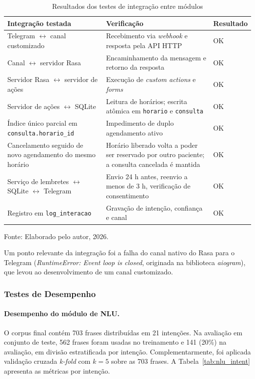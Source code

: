 \documentclass[12pt,a4paper]{extarticle}
\begin{document}
\begin{table}[H]
\centering
\caption{Resultados dos testes de integração entre módulos}
\label{tab:integracao}
\begin{tabular}{p{5.2cm}p{5.4cm}p{2cm}}
\hline
\textbf{Integração testada} & \textbf{Verificação} & \textbf{Resultado} \\
\hline
Telegram $\leftrightarrow$ canal customizado & Recebimento via \textit{webhook} e resposta pela API HTTP & OK \\
Canal $\leftrightarrow$ servidor Rasa & Encaminhamento da mensagem e retorno da resposta & OK \\
Servidor Rasa $\leftrightarrow$ servidor de ações & Execução de \textit{custom actions} e \textit{forms} & OK \\
Servidor de ações $\leftrightarrow$ SQLite & Leitura de horários; escrita atômica em \texttt{horario} e \texttt{consulta} & OK \\
Índice único parcial em \texttt{consulta.horario\_\allowbreak{}id} & Impedimento de duplo agendamento ativo & OK \\
Cancelamento seguido de novo agendamento do mesmo horário & Horário liberado volta a poder ser reservado por outro paciente; a consulta cancelada é mantida & OK \\
Serviço de lembretes $\leftrightarrow$ SQLite $\leftrightarrow$ Telegram & Envio 24 h antes, reenvio a menos de 3 h, verificação de consentimento & OK \\
Registro em \texttt{log\_\allowbreak{}interacao} & Gravação de intenção, confiança e canal & OK \\
\hline
\end{tabular}
\vspace{0.3cm}

\footnotesize{Fonte: Elaborado pelo autor, 2026.}
\end{table}

Um ponto relevante da integração foi a falha do canal nativo do Rasa para o Telegram (\textit{RuntimeError: Event loop is closed}, originada na biblioteca \textit{aiogram}), que levou ao desenvolvimento de um canal customizado. 

\subsubsection{Testes de Desempenho}
\label{sec:res_desempenho}

\paragraph{Desempenho do módulo de NLU.}
\label{sec:res_nlu}
O corpus final contém 703 frases distribuídas em 21 intenções. Na avaliação em conjunto de teste, 562 frases foram usadas no treinamento e 141 (20\%) na avaliação, em divisão estratificada por intenção. Complementarmente, foi aplicada validação cruzada \textit{k-fold} com $k=5$ sobre as 703 frases. A Tabela~\ref{tab:nlu_intent} apresenta as métricas por intenção.
\end{document}
